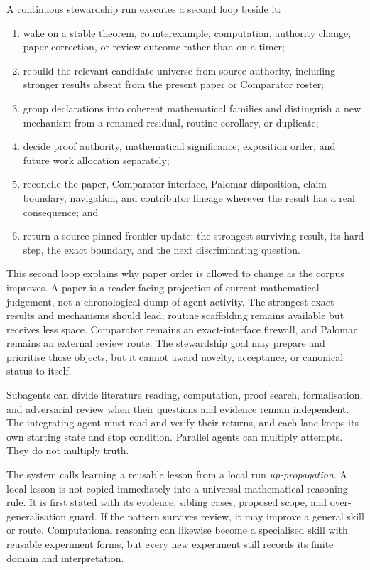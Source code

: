 \documentclass[10pt]{article}
\begin{document}
A continuous stewardship run executes a second loop beside it:

\begin{enumerate}
\item wake on a stable theorem, counterexample, computation, authority change,
      paper correction, or review outcome rather than on a timer;
\item rebuild the relevant candidate universe from source authority, including
      stronger results absent from the present paper or Comparator roster;
\item group declarations into coherent mathematical families and distinguish
      a new mechanism from a renamed residual, routine corollary, or duplicate;
\item decide proof authority, mathematical significance, exposition order,
      and future work allocation separately;
\item reconcile the paper, Comparator interface, Palomar disposition, claim
      boundary, navigation, and contributor lineage wherever the result has a
      real consequence; and
\item return a source-pinned frontier update: the strongest surviving result,
      its hard step, the exact boundary, and the next discriminating question.
\end{enumerate}

This second loop explains why paper order is allowed to change as the corpus
improves.  A paper is a reader-facing projection of current mathematical
judgement, not a chronological dump of agent activity.  The strongest exact
results and mechanisms should lead; routine scaffolding remains available but
receives less space.  Comparator remains an exact-interface firewall, and
Palomar remains an external review route.  The stewardship goal may prepare
and prioritise those objects, but it cannot award novelty, acceptance, or
canonical status to itself.

Subagents can divide literature reading, computation, proof search,
formalisation, and adversarial review when their questions and evidence remain
independent.  The integrating agent must read and verify their returns, and
each lane keeps its own starting state and stop condition.  Parallel agents
can multiply attempts.  They do not multiply truth.

The system calls learning a reusable lesson from a local run
\emph{up-propagation}.  A local lesson is not copied immediately into a
universal mathematical-reasoning rule.  It is first stated with its evidence,
sibling cases, proposed scope, and over-generalisation guard.  If the pattern
survives review, it may improve a general skill or route.  Computational
reasoning can likewise become a specialised skill with reusable experiment
forms, but every new experiment still records its finite domain and
interpretation.
\end{document}
